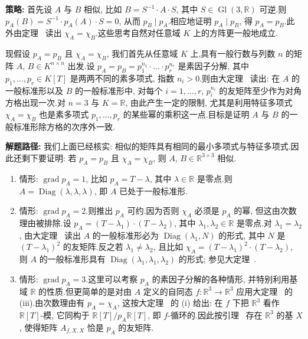\noindent\textbf{策略:} 首先设 $A$ 与 $B$ 相似, 比如 $B = S^{-1} \cdot A \cdot S$, 其中 $S \in \operatorname{Gl}(3, \mathbb{R})$ 可逆.则 $p_A(B) = S^{-1} \cdot p_A(A) \cdot S = 0$, 从而 $p_B \mid p_A$.相应地证明 $p_A \mid p_B$, 得 $p_A = p_B$.此外由定理~ 读出 $\chi_A = \chi_B$.这些思考自然对任意域 $K$ 上的方阵更一般地成立.

现假设 $p_A = p_B$ 且 $\chi_A = \chi_B$, 我们首先从任意域 $K$ 上,具有一般行数与列数 $n$ 的矩阵 $A$, $B \in K^{n \times n}$ 出发.设 $p_A = p_B = p_1^{n_1} \cdot \ldots \cdot p_r^{n_r}$ 是素因子分解, 其中 $p_1, \ldots, p_r \in K[T]$ 是两两不同的素多项式, 指数 $n_i > 0$.则由大定理~ 读出: 在 $A$ 的一般标准形以及 $B$ 的一般标准形中, 对每个 $i = 1, \ldots, r$, $p_i^{n_i}$ 的友矩阵至少作为对角方格出现一次.对 $n = 3$ 与 $K = \mathbb{R}$, 由此产生一定的限制, 尤其是利用特征多项式 $\chi_A = \chi_B$ 也是素多项式 $p_1, \ldots, p_r$ 的某些幂的乘积这一点.目标是证明 $A$ 与 $B$ 的一般标准形除方格的次序外一致.

\noindent\textbf{解题路径:} 我们上面已经核实: 相似的矩阵具有相同的最小多项式与特征多项式.因此还剩下要证明: 若 $p_A = p_B$ 且 $\chi_A = \chi_B$, 则 $A$, $B \in \mathbb{R}^{3 \times 3}$ 相似.

\begin{enumerate}
\item 情形: $\operatorname{grad} p_A = 1$, 比如 $p_A = T - \lambda$, 其中 $\lambda \in \mathbb{R}$ 是零点.则 $A = \operatorname{Diag}(\lambda, \lambda, \lambda)$, 即 $A$ 已处于一般标准形.
\item 情形: $\operatorname{grad} p_A = 2$.则推出 $p_A$ 可约.因为否则 $\chi_A$ 必须是 $p_A$ 的幂, 但这由次数理由被排除.设 $p_A = (T - \lambda_1) \cdot (T - \lambda_2)$, 其中 $\lambda_1, \lambda_2 \in \mathbb{R}$ 是零点.对 $\lambda_1 = \lambda_2$, 由大定理~ 读出 $A$ 的一般标准形必为 $\operatorname{Diag}(\lambda_1, N)$ 的形式, 其中 $N$ 是 $(T - \lambda_1)^2$ 的友矩阵.反之若 $\lambda_1 \neq \lambda_2$, 且比如 $\chi_A = (T - \lambda_1)^2 \cdot (T - \lambda_2)$, 则 $A$ 的一般标准形具有 $\operatorname{Diag}(\lambda_1, \lambda_1, \lambda_2)$ 的形式; 参见大定理~.
\item 情形: $\operatorname{grad} p_A = 3$.这里可以考察 $p_A$ 的素因子分解的各种情形, 并特别利用基域 $\mathbb{R}$ 的性质.但更简单的是对由 $A$ 定义的自同态 $f \colon \mathbb{R}^3 \longrightarrow \mathbb{R}^3$ 应用大定理~ 的 (iii).由次数理由有 $p_A = \chi_A$, 这按大定理~ 的 (i) 给出: 在 $f$ 下把 $\mathbb{R}^3$ 看作 $\mathbb{R}[T]$-模, 它同构于 $\mathbb{R}[T]/p_A \mathbb{R}[T]$, 即 $f$-循环的.因此按引理~ 存在 $\mathbb{R}^3$ 的基 $X$, 使得矩阵 $A_{f, X, X}$ 恰是 $p_A$ 的友矩阵.
\end{enumerate}

